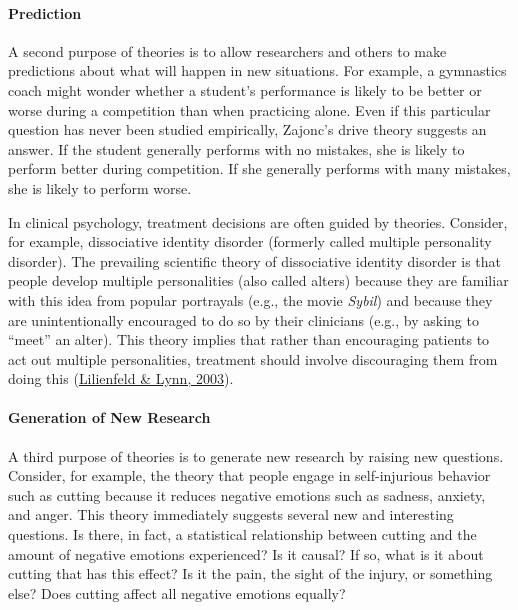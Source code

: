 \documentclass[
]{krantz}
\begin{document}
\hypertarget{prediction}{%
\paragraph*{Prediction}\label{prediction}}

A second purpose of theories is to allow researchers and others to make predictions about what will happen in new situations. For example, a gymnastics coach might wonder whether a student's performance is likely to be better or worse during a competition than when practicing alone. Even if this particular question has never been studied empirically, Zajonc's drive theory suggests an answer. If the student generally performs with no mistakes, she is likely to perform better during competition. If she generally performs with many mistakes, she is likely to perform worse.

In clinical psychology, treatment decisions are often guided by theories. Consider, for example, dissociative identity disorder (formerly called multiple personality disorder). The prevailing scientific theory of dissociative identity disorder is that people develop multiple personalities (also called alters) because they are familiar with this idea from popular portrayals (e.g., the movie \emph{Sybil}) and because they are unintentionally encouraged to do so by their clinicians (e.g., by asking to ``meet'' an alter). This theory implies that rather than encouraging patients to act out multiple personalities, treatment should involve discouraging them from doing this (\protect\hyperlink{ref-lilienfeld2003dissociative}{Lilienfeld \& Lynn, 2003}).

\hypertarget{generation-of-new-research}{%
\paragraph*{Generation of New Research}\label{generation-of-new-research}}

A third purpose of theories is to generate new research by raising new questions. Consider, for example, the theory that people engage in self-injurious behavior such as cutting because it reduces negative emotions such as sadness, anxiety, and anger. This theory immediately suggests several new and interesting questions. Is there, in fact, a statistical relationship between cutting and the amount of negative emotions experienced? Is it causal? If so, what is it about cutting that has this effect? Is it the pain, the sight of the injury, or something else? Does cutting affect all negative emotions equally?
\end{document}
